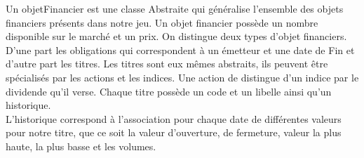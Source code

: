 \noindent Un objetFinancier est une classe Abstraite qui généralise l'ensemble des objets financiers présents dans notre jeu. Un objet financier possède un nombre disponible sur le marché et un prix. On distingue deux types d'objet financiers. D'une part les obligations qui correspondent à un émetteur et une date de Fin et d'autre part les titres. Les titres sont eux mêmes abstraits, ils peuvent être spécialisés par les actions et les indices. Une action de distingue d'un indice par le dividende qu'il verse. Chaque titre possède un code et un libelle ainsi qu'un historique. \\

\noindent L'historique correspond à l'association pour chaque date de différentes valeurs pour notre titre, que ce soit la valeur d'ouverture, de fermeture, valeur la plus haute, la plus basse et les volumes. 